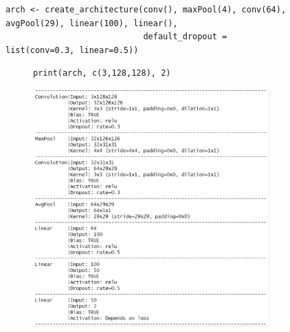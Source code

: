 \documentclass[12pt,twoside]{scrreport}
\begin{document}
\begin{figure}[t]
	\centering
	\newsavebox{\archbox} %
	\begin{lrbox}{\archbox}
		\begin{lstlisting}
arch <- create_architecture(conv(), maxPool(4), conv(64), avgPool(29), linear(100), linear(),
                            default_dropout = list(conv=0.3, linear=0.5))
		\end{lstlisting}
	\end{lrbox}
	\resizebox{\textwidth}{!}{\fbox{\usebox{\archbox}}}
	\begin{subfigure}{0.47\textwidth}
		\centering
		\vspace*{0.2cm}
		\newsavebox{\printbox} %
		\begin{lrbox}{\printbox}
			\begin{lstlisting}[basicstyle=\footnotesize]
print(arch, c(3,128,128), 2)
			\end{lstlisting}
		\end{lrbox}
		\fbox{\usebox{\printbox}}
		\newline
		\vspace*{0.04cm}
		\includegraphics[width=\textwidth]{print.pdf}
	\end{subfigure}
	\hfill
	\begin{subfigure}{0.47\textwidth}

\end{subfigure}
\end{figure}
\end{document}
